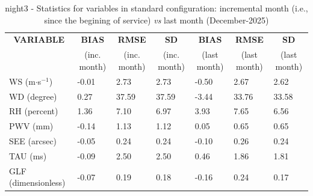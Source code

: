 \begin{table}[h!]
\begin{center}
\begin{tabular}{|l|l|l|l|l|l|l|}
\hline
\multicolumn{1}{|c|}{\cellcolor[HTML]{C0C0C0}\textbf{VARIABLE}} & \multicolumn{1}{c|}{\cellcolor[HTML]{C0C0C0}\textbf{BIAS}} & \multicolumn{1}{c|}{\cellcolor[HTML]{C0C0C0}\textbf{RMSE}} & \multicolumn{1}{c|}{\cellcolor[HTML]{C0C0C0}\textbf{SD}} & \multicolumn{1}{c|}{\cellcolor[HTML]{C0C0C0}\textbf{BIAS}} & \multicolumn{1}{c|}{\cellcolor[HTML]{C0C0C0}\textbf{RMSE}} & \multicolumn{1}{c|}{\cellcolor[HTML]{C0C0C0}\textbf{SD}}\\
\multicolumn{1}{|c|}{\cellcolor[HTML]{C0C0C0}} & \multicolumn{1}{c|}{\cellcolor[HTML]{C0C0C0}(inc. month)} & \multicolumn{1}{c|}{\cellcolor[HTML]{C0C0C0}(inc. month)} & \multicolumn{1}{c|}{\cellcolor[HTML]{C0C0C0}(inc. month)} & \multicolumn{1}{c|}{\cellcolor[HTML]{C0C0C0}(last month)} & \multicolumn{1}{c|}{\cellcolor[HTML]{C0C0C0}(last month)} & \multicolumn{1}{c|}{\cellcolor[HTML]{C0C0C0}(last month)}\\\hline
\cellcolor[HTML]{C0C0C0}WS (m$\cdot$s$^{-1}$) &     -0.01  &      2.73  &      2.73  &     -0.50     &      2.67     &      2.62\\
\cellcolor[HTML]{C0C0C0}WD (degree)           &      0.27  &     37.59  &     37.59  &     -3.44     &     33.76     &     33.58\\
\cellcolor[HTML]{C0C0C0}RH (percent)          &      1.36  &      7.10  &      6.97  &      3.93     &      7.65     &      6.56\\
\cellcolor[HTML]{C0C0C0}PWV (mm)              &     -0.14 &      1.13 &      1.12 &      0.05    &      0.65    &      0.65\\
\cellcolor[HTML]{C0C0C0}SEE (arcsec)          &     -0.05 &      0.24 &      0.24 &     -0.10    &      0.26    &      0.24\\
\cellcolor[HTML]{C0C0C0}TAU (ms)              &     -0.09 &      2.50 &      2.50 &      0.46    &      1.86    &      1.81\\
\cellcolor[HTML]{C0C0C0}GLF (dimensionless)   &     -0.07 &      0.19 &      0.18 &     -0.16    &      0.24    &      0.17\\
\hline
\end{tabular}
\caption{night3 - Statistics for variables in standard configuration: incremental month (i.e., since the begining of service) \textit{vs} last month (December-2025)}\label{tab:night3:statBEF}
\end{center}
\end{table}

